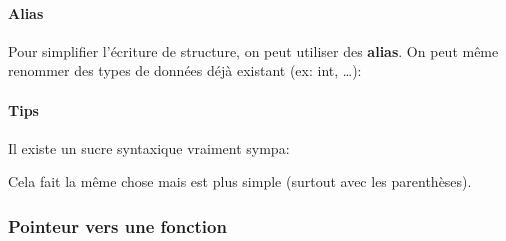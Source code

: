 \paragraph{Alias}\label{alias}

Pour simplifier l'écriture de structure, on peut utiliser des
\textbf{alias}. On peut même renommer des types de données déjà existant
(ex: int, \ldots):

\begin{Shaded}
\begin{Highlighting}[]
 \OperatorTok{\{} 
    \OperatorTok{;} 
    \OperatorTok{;} 
\OperatorTok{\}}\OperatorTok{;}

 \OperatorTok{;}

\OperatorTok{(}\OperatorTok{,}  \OperatorTok{*}\OperatorTok{[])} \OperatorTok{\{}
\OperatorTok{=} \OperatorTok{\{}\OperatorTok{,} \OperatorTok{\};} 
\OperatorTok{=} \OperatorTok{;} 
    \OperatorTok{;}
\OperatorTok{\}}
\end{Highlighting}
\end{Shaded}

\paragraph{Tips}\label{tips}

Il existe un sucre syntaxique vraiment sympa:

\begin{Shaded}
\begin{Highlighting}[]
\OperatorTok{(*}\OperatorTok{;}
\OperatorTok{{-}\textgreater{}}\OperatorTok{;}
\end{Highlighting}
\end{Shaded}

Cela fait la même chose mais est plus simple (surtout avec les
parenthèses).

\subsubsection{Pointeur vers une
fonction}\label{pointeur-vers-une-fonction}

